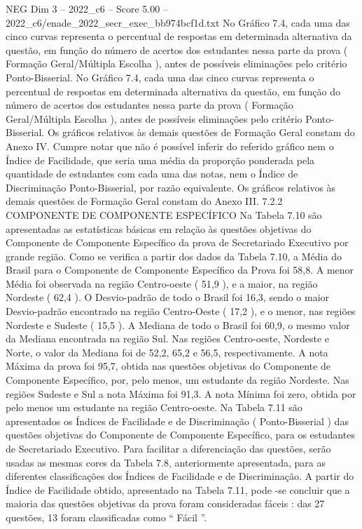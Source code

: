 \begin{textsample}{NEG Dim 3 – 2022\_c6 – Score 5.00 – 2022\_c6/enade\_2022\_secr\_exec\_bb974bcf1d.txt}
No Gráfico 7.4, cada uma das cinco curvas representa o percentual de respostas em determinada alternativa da questão, em função do número de acertos dos estudantes nessa parte da prova ( Formação Geral/Múltipla Escolha ), antes de possíveis eliminações pelo critério Ponto-Bisserial.
No Gráfico 7.4, cada uma das cinco curvas representa o percentual de respostas em determinada alternativa da questão, em função do número de acertos dos estudantes nessa parte da prova ( Formação Geral/Múltipla Escolha ), antes de possíveis eliminações pelo critério Ponto-Bisserial.
Os gráficos relativos às demais questões de Formação Geral constam do Anexo IV.
Cumpre notar que não é possível inferir do referido gráfico nem o Índice de Facilidade, que seria uma média da proporção ponderada pela quantidade de estudantes com cada uma das notas, nem o Índice de Discriminação Ponto-Bisserial, por razão equivalente.
Os gráficos relativos às demais questões de Formação Geral constam do Anexo III. 7.2.2 COMPONENTE DE COMPONENTE ESPECÍFICO Na Tabela 7.10 são apresentadas as estatísticas básicas em relação às questões objetivas do Componente de Componente Específico da prova de Secretariado Executivo por grande região.
Como se verifica a partir dos dados da Tabela 7.10, a Média do Brasil para o Componente de Componente Específico da Prova foi 58,8.
A menor Média foi observada na região Centro-oeste ( 51,9 ), e a maior, na região Nordeste ( 62,4 ).
O Desvio-padrão de todo o Brasil foi 16,3, sendo o maior Desvio-padrão encontrado na região Centro-Oeste ( 17,2 ), e o menor, nas regiões Nordeste e Sudeste ( 15,5 ).
A Mediana de todo o Brasil foi 60,9, o mesmo valor da Mediana encontrada na região Sul.
Nas regiões Centro-oeste, Nordeste e Norte, o valor da Mediana foi de 52,2, 65,2 e 56,5, respectivamente.
A nota Máxima da prova foi 95,7, obtida nas questões objetivas do Componente de Componente Específico, por, pelo menos, um estudante da região Nordeste.
Nas regiões Sudeste e Sul a nota Máxima foi 91,3.
A nota Mínima foi zero, obtida por pelo menos um estudante na região Centro-oeste.
Na Tabela 7.11 são apresentados os Índices de Facilidade e de Discriminação ( Ponto-Bisserial ) das questões objetivas do Componente de Componente Específico, para os estudantes de Secretariado Executivo.
Para facilitar a diferenciação das questões, serão usadas as mesmas cores da Tabela 7.8, anteriormente apresentada, para as diferentes classificações dos Índices de Facilidade e de Discriminação.
A partir do Índice de Facilidade obtido, apresentado na Tabela 7.11, pode -se concluir que a maioria das questões objetivas da prova foram consideradas fáceis : das 27 questões, 13 foram classificadas como “ Fácil ”.

\end{textsample}
